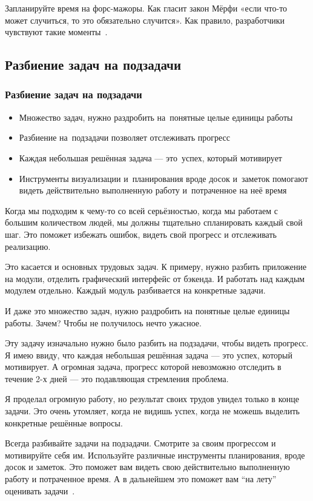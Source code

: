 \documentclass{../industrial-development}
\begin{document}
Запланируйте время на форс-мажоры. Как гласит закон Мёрфи «если что-то может случиться, то это обязательно случится». Как правило, разработчики чувствуют такие моменты~\cite{TMHabr}.

\subsection{Разбиение задач на подзадачи}

\begin{frame} \frametitle{Разбиение задач на подзадачи}
  \begin{itemize}
  \item Множество задач, нужно раздробить на~понятные целые единицы работы
  \item Разбиение на~подзадачи позволяет отслеживать прогресс
  \item Каждая небольшая решённая задача — это~успех, который мотивирует
  \item Инструменты визуализации и~планирования вроде досок и~заметок помогают видеть действительно выполненную работу и~потраченное на неё время
  \end{itemize}
\end{frame}

\lecturenotes

Когда мы подходим к чему-то со всей серьёзностью, когда мы работаем с большим количеством людей, мы должны тщательно спланировать каждый свой шаг. Это поможет избежать ошибок, видеть свой прогресс и отслеживать реализацию.

Это касается и основных трудовых задач. К примеру, нужно разбить приложение на модули, отделить графический интерфейс от бэкенда. И работать над каждым модулем отдельно.
Каждый модуль разбивается на конкретные задачи.

И даже это множество задач, нужно раздробить на понятные целые единицы работы. Зачем? Чтобы не получилось нечто ужасное.

Эту задачу изначально нужно было разбить на подзадачи, чтобы видеть прогресс. Я имею ввиду, что каждая небольшая решённая задача — это успех, который мотивирует. А огромная задача, прогресс которой невозможно отследить в течение 2-х дней — это подавляющая стремления проблема.

Я проделал огромную работу, но результат своих трудов увидел только в конце задачи. Это очень утомляет, когда не видишь успех, когда не можешь выделить конкретные решённые вопросы.

Всегда разбивайте задачи на подзадачи. Смотрите за своим прогрессом и мотивируйте себя им. Используйте различные инструменты планирования, вроде досок и заметок. Это поможет вам видеть свою действительно выполненную работу и потраченное время. А в дальнейшем это поможет вам “на лету” оценивать задачи~\cite{TasksMedium}.
\end{document}

